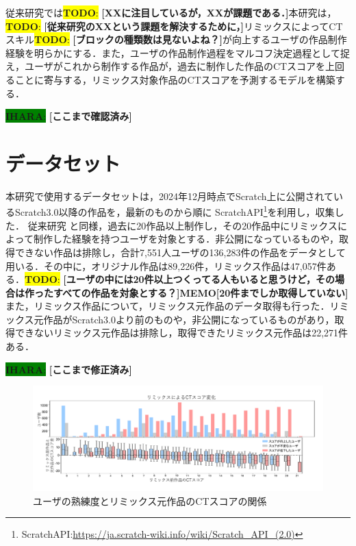 \documentclass[submit,techrep,noauthor]{ipsj}
\newcommand{\todo}[1]{\colorbox{yellow}{{\bf TODO}:}{\color{red} {\textbf{[#1]}}}}
\newcommand{\ihara}[1]{\colorbox{green}{{\bf IHARA}:}{\color{blue} {\textbf{[#1]}}}}
\newcommand{\memo}[1]{\colorbox{magenta!30}{\textbf{MEMO}}{\color{red!50}\textbf{[#1]}}}
\begin{document}
従来研究では\todo{XXに注目しているが，XXが課題である．}本研究は，\todo{従来研究のXXという課題を解決するために，}リミックスによってCTスキル\todo{ブロックの種類数は見ないよね？}が向上するユーザの作品制作経験を明らかにする．また，ユーザの作品制作過程をマルコフ決定過程として捉え，ユーザがこれから制作する作品が，過去に制作した作品のCTスコアを上回ることに寄与する，リミックス対象作品のCTスコアを予測するモデルを構築する．

\ihara{ここまで確認済み}

\section{データセット}
\label{sec:dataset}

本研究で使用するデータセットは，2024年12月時点でScratch上に公開されているScratch3.0以降の作品を，最新のものから順に
ScratchAPI\footnote{ScratchAPI:\url{https://ja.scratch-wiki.info/wiki/Scratch\_API\_(2.0)}}を利用し，収集した．
従来研究\cite{hashitani2022scratch} と同様，過去に20作品以上制作し，その20作品中にリミックスによって制作した経験を持つユーザを対象とする．非公開になっているものや，取得できない作品は排除し，合計7,551人ユーザの136,283件の作品をデータとして用いる．その中に，オリジナル作品は89,226件，リミックス作品は47,057件ある．\todo{ユーザの中には20件以上つくってる人もいると思うけど，その場合は作ったすべての作品を対象とする？}\memo{20件までしか取得していない}また，リミックス作品について，リミックス元作品のデータ取得も行った．リミックス元作品がScratch3.0より前のものや，非公開になっているものがあり，取得できないリミックス元作品は排除し，取得できたリミックス元作品は22,271件ある．

\ihara{ここまで修正済み}

\begin{figure}[t]
  \centering
  \includegraphics[width=\textwidth]{@IPSJ_SIGSE202511_Horio/fig/preAnalysis.pdf}
  \caption{ユーザの熟練度とリミックス元作品のCTスコアの関係}
  \label{preAnalysis}
\end{figure}
\end{document}
